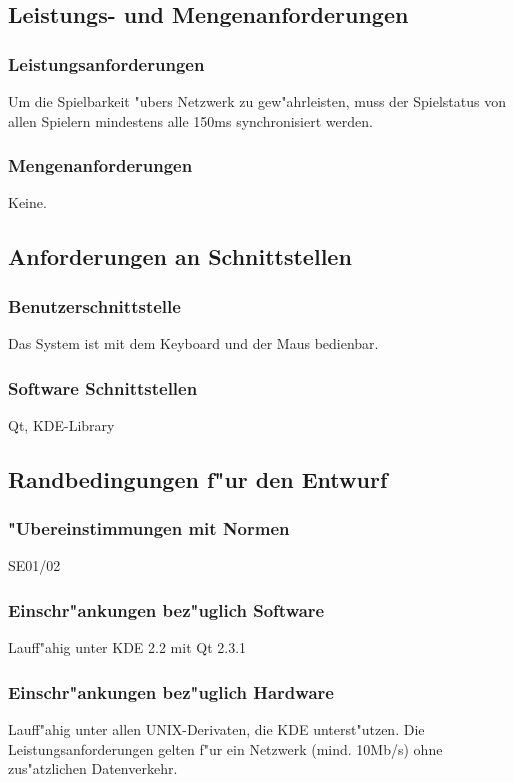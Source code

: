 \subsection{Leistungs- und Mengenanforderungen}
\label{LeistungsAnforderungen2}
\subsubsection{Leistungsanforderungen}
Um die Spielbarkeit "ubers Netzwerk zu gew"ahrleisten, muss der Spielstatus von allen Spielern mindestens
alle 150ms synchronisiert werden.

\subsubsection{Mengenanforderungen}
Keine.

\subsection{Anforderungen an Schnittstellen}

\subsubsection{Benutzerschnittstelle}
Das System ist mit dem Keyboard und der Maus bedienbar.

\subsubsection{Software Schnittstellen}
Qt, KDE-Library

\subsection{Randbedingungen f"ur den Entwurf}

\subsubsection{"Ubereinstimmungen mit Normen}
SE01/02

\subsubsection{Einschr"ankungen bez"uglich Software}
Lauff"ahig unter KDE 2.2 mit Qt 2.3.1

\subsubsection{Einschr"ankungen bez"uglich Hardware}
Lauff"ahig unter allen UNIX-Derivaten, die KDE unterst"utzen. Die Leistungsanforderungen gelten f"ur ein Netzwerk (mind. 10Mb/s)
ohne zus"atzlichen Datenverkehr.

